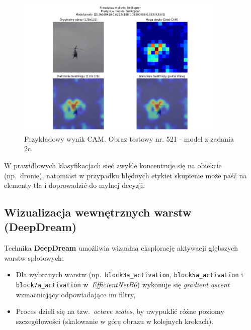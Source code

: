 \begin{figure}[H]
    \centering
    \includegraphics[width=0.9\textwidth]{img/zad3/modelzad2c_heatmap_521_true_helikopter_pred_helikopter.png}
    \caption{Przykładowy wynik CAM. Obraz testowy nr. 521 - model z zadania 2c.}
    \label{fig:z3_cam}
\end{figure}
W prawidłowych klasyfikacjach sieć zwykle koncentruje się na obiekcie (np.\ dronie), natomiast w przypadku błędnych etykiet skupienie może paść na elementy tła i doprowadzić do mylnej decyzji.


\subsection{Wizualizacja wewnętrznych warstw (DeepDream)}
Technika \textbf{DeepDream} umożliwia wizualną eksplorację aktywacji głębszych warstw splotowych:
\begin{itemize}
    \item Dla wybranych warstw (np.\ \texttt{block3a\_activation}, \texttt{block5a\_activation} i \texttt{block7a\_activation} w~\emph{EfficientNetB0}) wykonuje się \emph{gradient ascent} wzmacniający odpowiadające im filtry,
    \item Proces dzieli się na tzw.\ \emph{octave scales}, by uwypuklić różne poziomy szczegółowości (skalowanie w górę obrazu w kolejnych krokach).
\end{itemize}

